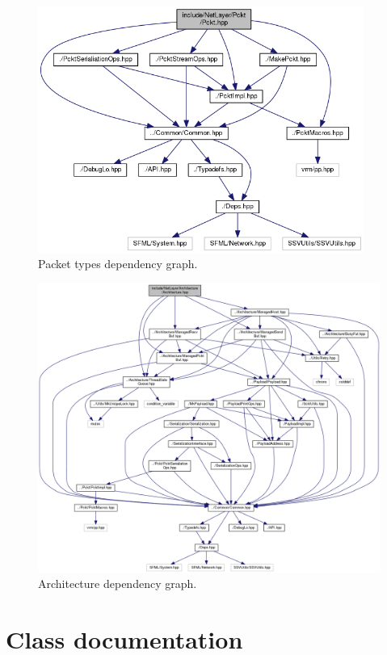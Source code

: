 \documentclass[11pt]{report}
\newcommand{\+}{\discretionary{\mbox{\scriptsize$\hookleftarrow$}}{}{}}
\begin{document}
    \begin{figure}[!htb]
    \caption{Packet types dependency graph.}
    \centering
    \includegraphics[width=0.95\textwidth]{inc/dep_pckt.png}
    \end{figure}

    \begin{figure}[!htb]
    \caption{Architecture dependency graph.}
    \centering
    \includegraphics[width=1\textwidth]{inc/dep_archi.png}
    \end{figure}

\chapter{Class documentation}
    
    
    
    
    
    
    
    
    
    
    
    
\end{document}
